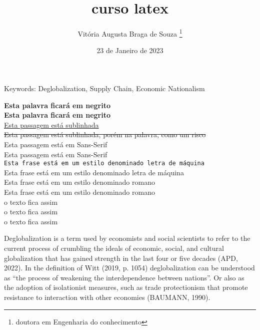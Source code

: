 \documentclass[12pt, a4paper, oneside]{book}
\begin{document}
\title{curso latex}
\author{Vitória Augusta Braga de Souza \footnote{doutora em Engenharia do conhecimento}}
\date{23 de Janeiro de 2023}
\maketitle %
\begin{flushleft}%



Keywords: Deglobalization, Supply Chain, Economic Nationalism
\end{flushleft}

\noindent
\textbf {Esta palavra ficará em negrito}\\
{\bfseries Esta palavra ficará em negrito}\\

\noindent
\underline {Esta passagem está sublinhada}\\
\sout {Esta passagem está sublinhada, porém na palavra, como um risco}\\

\noindent
\textsf{Esta passagem está em Sans-Serif}\\
{\sffamily Esta passagem está em Sans-Serif}\\

\noindent
\texttt{Esta frase está em um estilo denominado letra de máquina}\\
{\ttfamily Esta frase está em um estilo denominado letra de máquina}\\

\textrm{Esta frase está em um estilo denominado romano}\\
{\rmfamily Esta frase está em um estilo denominado romano}\\

\noindent
\small {o texto fica assim}\\
\large{o texto fica assim}\\
\Huge {o texto fica assim}\\

\begin{small} %

Deglobalization is a term used by economists and social scientists to refer to the current process of crumbling the ideals of economic, social, and cultural globalization that has gained strength in the last four or five decades (APD, 2022). In the definition of Witt (2019, p. 1054) deglobalization can be understood as “the process of weakening the interdependence between nations”. Or also as the adoption of isolationist measures, such as trade protectionism that promote resistance to interaction with other economies (BAUMANN, 1990).
\end{small}
\end{document}
